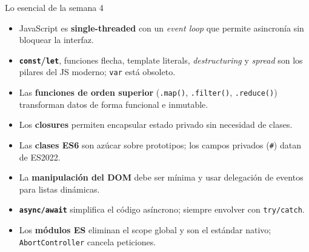 \documentclass[11pt,a4paper,openany]{book}
\begin{document}
	\begin{cajadefinicion}{Lo esencial de la semana 4}
		\begin{itemize}
			\item JavaScript es \textbf{single-threaded} con un \emph{event
				loop} que permite asincronía sin bloquear la interfaz.
			\item \textbf{\texttt{const}/\texttt{let}}, funciones flecha,
			template literals, \emph{destructuring} y \emph{spread} son
			los pilares del JS moderno; \texttt{var} está obsoleto.
			\item Las \textbf{funciones de orden superior}
			(\texttt{.map()}, \texttt{.filter()}, \texttt{.reduce()})
			transforman datos de forma funcional e inmutable.
			\item Los \textbf{closures} permiten encapsular estado privado
			sin necesidad de clases.
			\item Las \textbf{clases ES6} son azúcar sobre prototipos;
			los campos privados (\texttt{\#}) datan de ES2022.
			\item La \textbf{manipulación del DOM} debe ser mínima y usar
			delegación de eventos para listas dinámicas.
			\item \textbf{\texttt{async/await}} simplifica el código
			asíncrono; siempre envolver con \texttt{try/catch}.
			\item Los \textbf{módulos ES} eliminan el scope global y son
			el estándar nativo; \texttt{AbortController} cancela peticiones.
		\end{itemize}
	\end{cajadefinicion}
	
	
	
	
\end{document}
